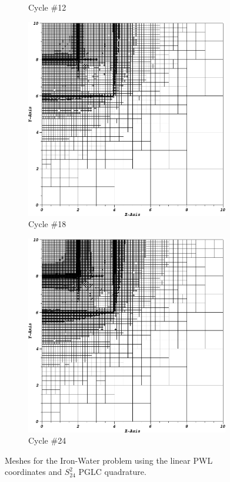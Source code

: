 \begin{figure}
\begin{subfigure}[b]{0.485\textwidth}
		\caption{Cycle \#12}
	\end{subfigure}
	\vfill
	\begin{subfigure}[b]{0.485\textwidth}
		\centering
		\includegraphics[width=0.975\textwidth]{figures/sec_DSA/IW_PWLD1_PGLC24_cyc18.png}
		\caption{Cycle \#18}
	\end{subfigure}
	\hfill
	\begin{subfigure}[b]{0.485\textwidth}
		\centering
		\includegraphics[width=0.975\textwidth]{figures/sec_DSA/IW_PWLD1_PGLC24_cyc24.png}
		\caption{Cycle \#24}
	\end{subfigure}
\caption{Meshes for the Iron-Water problem using the linear PWL coordinates and $S_{24}^2$ PGLC quadrature.}
\label{fig::IW_PWLD1_PGLC24_meshes}
\end{figure}

